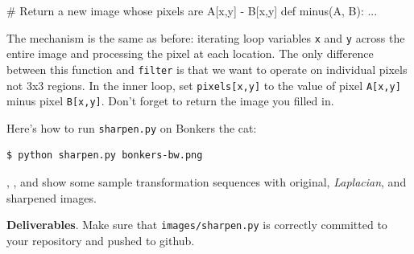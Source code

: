 \begin{pyverbatim}
# Return a new image whose pixels are A[x,y] - B[x,y]
def minus(A, B):
	...
\end{pyverbatim}

The mechanism is the same as before: iterating loop variables {\tt x} and {\tt y} across the entire image and processing the pixel at each location. The only difference between this function and {\tt filter} is that we want to operate on individual pixels not 3x3 regions.  In the inner loop, set {\tt pixels[x,y]} to the value of pixel {\tt A[x,y]} minus pixel {\tt B[x,y]}. Don't forget to return the image you filled in.

Here's how to run {\tt sharpen.py} on Bonkers the cat:

\begin{lstlisting}[style=BashInputStyle]
$ python sharpen.py bonkers-bw.png
\end{lstlisting}

\noindent {}, , and  show some sample transformation sequences with original, {\em Laplacian}, and sharpened images.

\begin{callout}{\bcplume}
{\bf Deliverables}. Make sure that {\tt images/sharpen.py} is correctly committed to your repository and pushed to github.
\end{callout}


